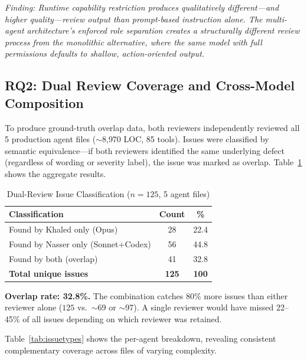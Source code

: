 \documentclass[11pt,a4paper]{article}
\begin{document}
\textit{Finding: Runtime capability restriction produces qualitatively different---and higher quality---review output than prompt-based instruction alone. The multi-agent architecture's enforced role separation creates a structurally different review process from the monolithic alternative, where the same model with full permissions defaults to shallow, action-oriented output.}

\subsection{RQ2: Dual Review Coverage and Cross-Model Composition}
\label{sec:rq2}

To produce ground-truth overlap data, both reviewers independently reviewed all 5 production agent files ($\sim$8{,}970 LOC, 85 tools). Issues were classified by semantic equivalence---if both reviewers identified the same underlying defect (regardless of wording or severity label), the issue was marked as overlap. Table~\ref{tab:dualreview} shows the aggregate results.

\begin{table}[htbp]
\caption{Dual-Review Issue Classification ($n=125$, 5 agent files)}
\label{tab:dualreview}
\centering
\begin{tabular}{@{}lcc@{}}
\toprule
\textbf{Classification} & \textbf{Count} & \textbf{\%} \\
\midrule
Found by Khaled only (Opus) & 28 & 22.4 \\
Found by Nasser only (Sonnet+Codex) & 56 & 44.8 \\
Found by both (overlap) & 41 & 32.8 \\
\midrule
\textbf{Total unique issues} & \textbf{125} & \textbf{100} \\
\bottomrule
\end{tabular}
\end{table}

\textbf{Overlap rate: 32.8\%.} The combination catches 80\% more issues than either reviewer alone ($125$ vs.\ $\sim$69 or $\sim$97). A single reviewer would have missed 22--45\% of all issues depending on which reviewer was retained.

Table~\ref{tab:issuetypes} shows the per-agent breakdown, revealing consistent complementary coverage across files of varying complexity.
\end{document}
